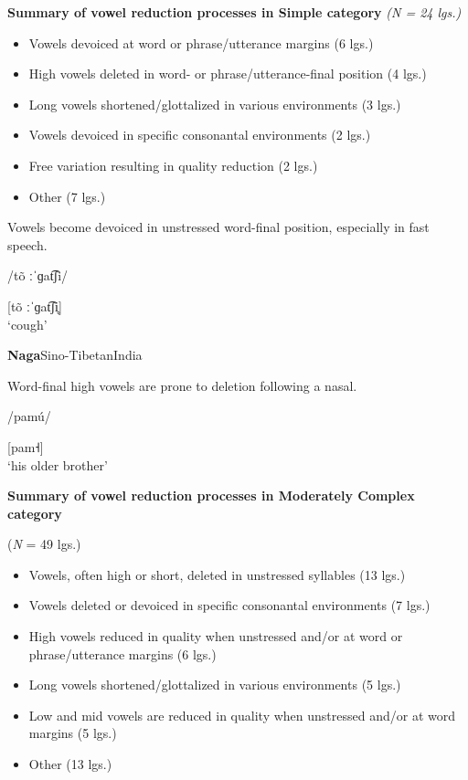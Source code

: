\ea\label{ex:6.16}
  \textbf{Summary of vowel reduction processes in Simple category} \textit{(N = 24 lgs.)}
\begin{itemize}
\item Vowels devoiced at word or phrase/utterance margins {(6 lgs.)}
\item High vowels deleted in word- or phrase/utterance-final position {(4 lgs.)}
\item Long vowels shortened/glottalized in various environments {(3 lgs.)}
\item Vowels devoiced in specific consonantal environments {(2 lgs.)}
\item Free variation resulting in quality reduction {(2 lgs.)}
\item Other {(7 lgs.)}
\end{itemize}

\ea{}

Vowels become devoiced in unstressed word-final position, especially in fast speech.

/tõ ːˈɡat͡ʃi/

[tõ ːˈɡat͡ʃi̥]\\
\glt ‘cough’
\citep[60-1]{Facundes2000}

\ex{} \textbf{Naga}{Sino-Tibetan}{India}

Word-final high vowels are prone to deletion following a nasal.

/pamú/

[pam˧]\\
\glt ‘his older brother’
\citep[369]{Teo2012}
\z
\z

\ea\label{ex:6.17}
  \textbf{Summary of vowel reduction processes in Moderately Complex category} 

(\textit{N} = 49 lgs.)

\begin{itemize}
\item Vowels, often high or short, deleted in unstressed syllables (13 lgs.)
\item Vowels deleted or devoiced in specific consonantal environments (7 lgs.)
\item High vowels reduced in quality when unstressed and/or at word or phrase/utterance margins (6 lgs.)
\item Long vowels shortened/glottalized in various environments (5 lgs.)
\item Low and mid vowels are reduced in quality when unstressed and/or at word margins (5 lgs.)
\item Other {(13 lgs.)}
\end{itemize}

